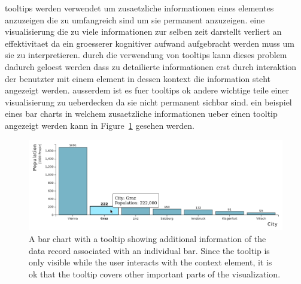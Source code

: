 
tooltips werden verwendet um zusaetzliche informationen eines elementes anzuzeigen die zu umfangreich sind um sie permanent anzuzeigen.
eine visualisierung die zu viele informationen zur selben zeit darstellt verliert an effektivitaet da ein groesserer kognitiver aufwand aufgebracht werden muss um sie zu interpretieren.
durch die verwendung von tooltips kann dieses problem dadurch geloest werden dass zu detailierte informationen erst durch interaktion der benutzter mit einem element in dessen kontext die information steht angezeigt werden.
ausserdem ist es fuer tooltips ok andere wichtige teile einer visualisierung zu ueberdecken da sie nicht permanent sichbar sind.
ein beispiel eines bar charts in welchem zusaetzliche informationen ueber einen tooltip angezeigt werden kann in Figure~\ref{fig:Tooltip} gesehen werden.

\begin{figure}[tp]
\centering
\includegraphics[keepaspectratio,width=\linewidth,height=\fullh]{images/tooltip.png}
\caption[Tooltip Example]{
  A bar chart with a tooltip showing additional information of the data record associated with an individual bar.
  Since the tooltip is only visible while the user interacts with the context element, it is ok that the tooltip covers other important parts of the visualization.
  }
  \label{fig:Tooltip}
\end{figure}
  
